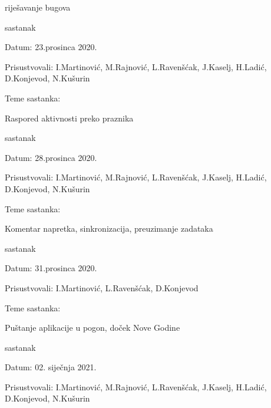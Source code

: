 \begin{packed_enum}
\begin{packed_item}
\begin{packed_item}
				\item   riješavanje bugova
			\end{packed_item}
		\end{packed_item}
	\item sastanak
		\item[] \begin{packed_item}
			\item Datum: 23.prosinca 2020.
			\item Prisustvovali: I.Martinović, M.Rajnović, L.Ravenšćak, J.Kaselj, H.Ladić, D.Konjevod, N.Kušurin
			\item Teme sastanka: 
			\begin{packed_item}
				\item Raspored aktivnosti preko praznika  
			\end{packed_item}
		\end{packed_item}
	\item sastanak
		\item[] \begin{packed_item}
		\item Datum: 28.prosinca 2020.
		\item Prisustvovali: I.Martinović, M.Rajnović, L.Ravenšćak, J.Kaselj, H.Ladić, D.Konjevod, N.Kušurin
		\item Teme sastanka: 
		\begin{packed_item}
			\item   Komentar napretka, sinkronizacija, preuzimanje zadataka
		\end{packed_item}
		\end{packed_item}
	\item sastanak
		\item[] \begin{packed_item}
		\item Datum: 31.prosinca 2020.
		\item Prisustvovali: I.Martinović, L.Ravenšćak, D.Konjevod
		\item Teme sastanka: 
		\begin{packed_item}
			\item   Puštanje aplikacije u pogon, doček Nove Godine
		\end{packed_item}
	\end{packed_item}
   \item sastanak
				\item[] \begin{packed_item}
				\item Datum: 02. siječnja 2021.
				\item Prisustvovali: I.Martinović, M.Rajnović, L.Ravenšćak, J.Kaselj, H.Ladić, D.Konjevod, N.Kušurin

\end{packed_item}
\end{packed_enum}
